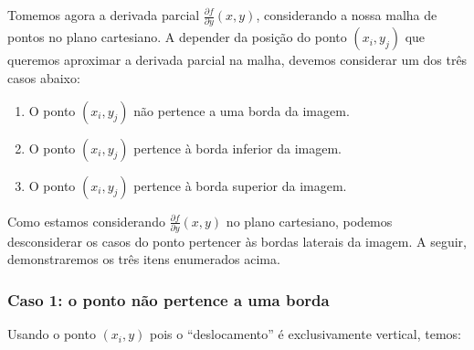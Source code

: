 \documentclass[11pt]{article}
\begin{document}
  \indent\indent Tomemos agora a derivada parcial $\frac{\partial f}{\partial y}(x, y)$, considerando a nossa malha de pontos no plano cartesiano. A depender da posição do ponto  $(x_i, y_j)$ que
  queremos aproximar a derivada parcial na malha, devemos considerar um dos três casos abaixo:

  \begin{enumerate}[label=\textbf{\arabic*.}]
    \item O ponto $(x_i, y_j)$ não pertence a uma borda da imagem.
    \item O ponto $(x_i, y_j)$ pertence à borda inferior da imagem.
    \item O ponto $(x_i, y_j)$ pertence à borda superior da imagem.
  \end{enumerate}

  Como estamos considerando $\frac{\partial f}{\partial y}(x, y)$ no plano cartesiano, podemos desconsiderar os casos do ponto pertencer às bordas laterais da imagem. A seguir, demonstraremos os três itens
  enumerados acima.

  \subsubsection{Caso 1: o ponto não pertence a uma borda}

  \indent\indent Usando o ponto $(x_i, y)$ pois o ``deslocamento'' é exclusivamente vertical, temos:
\end{document}
